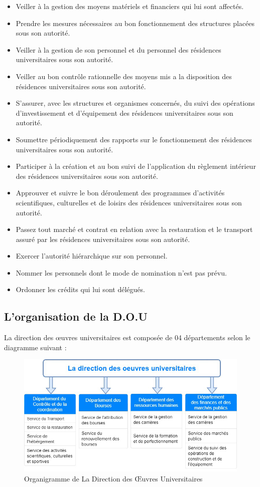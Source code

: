 \begin{itemize}\renewcommand{\labelitemi}{$\bullet$}
    \item Veiller à la gestion des moyens matériels et financiers qui lui sont affectés.
    \item Prendre les mesures nécessaires au bon fonctionnement des structures placées sous son autorité.
    \item Veiller à la gestion de son personnel et du personnel des résidences universitaires sous son autorité.
    \item Veiller au bon contrôle rationnelle des moyens mis a la disposition des résidences universitaires sous son autorité.
    \item S'assurer, avec les structures et organismes concernés, du suivi des opérations d'investissement et d'équipement des résidences universitaires sous son autorité.
    \item Soumettre périodiquement des rapports sur le fonctionnement des résidences universitaires sous son autorité.
    \item Participer à la création et au bon suivi de l'application du règlement intérieur des résidences universitaires sous son autorité.
    \item Approuver et suivre le bon déroulement des programmes d'activités scientifiques, culturelles et de loisirs des résidences universitaires sous son autorité.
    \item Passez tout marché et contrat en relation avec la restauration et le transport assuré par les résidences universitaires sous son autorité.
    \item Exercer l'autorité hiérarchique sur son personnel.
    \item Nommer les personnels dont le mode de nomination n'est pas prévu.
    \item Ordonner les crédits qui lui sont délégués.
\end{itemize}

\subsection{L’organisation de la \acs{D.O.U}}
La direction des œuvres universitaires\cite{onou-arrete} est composée de 04 départements selon le diagramme suivant :

\begin{figure}[H]
    \centering
    \includegraphics[scale=0.6]{DOU/direction-org.jpg}
    \caption{Organigramme de La Direction des Œuvres Universitaires}
\end{figure}

